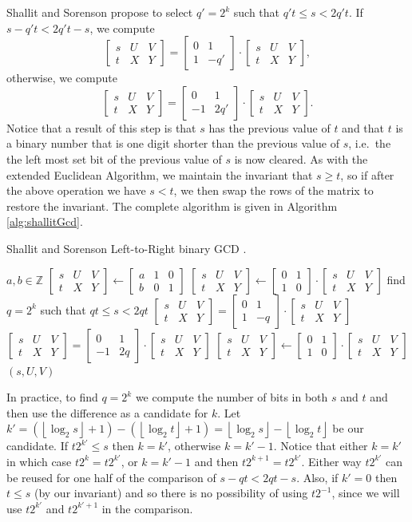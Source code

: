 \documentclass{ucalgthes1}
\theoremstyle{definition}
\newcommand{\ZZ}{\mathbb{Z}}
\newcommand{\matrixtt}[4]{\left[ \begin{array}{rr} #1 & #2 \\ #3 & #4 \end{array} \right]}
\newcommand{\matrixThreeTwo}[6]{\left[ \begin{array}{rrr} #1 & #2 & #3 \\ #4 & #5 & #6 \end{array} \right]}
\newcommand{\floor}[1]{\left\lfloor #1 \right\rfloor}
\begin{document}
Shallit and Sorenson \cite{Shallit1994} propose to select $q'=2^k$ such that $q't \le s < 2q't$.  If $s - q't < 2q't - s$, we compute
\[
	\matrixThreeTwo{s}{U}{V}{t}{X}{Y} =
		\matrixtt{0}{1}{1}{-q'} \cdot \matrixThreeTwo{s}{U}{V}{t}{X}{Y},
\]
otherwise, we compute
\[
	\matrixThreeTwo{s}{U}{V}{t}{X}{Y} =
		\matrixtt{0}{1}{-1}{2q'} \cdot \matrixThreeTwo{s}{U}{V}{t}{X}{Y}.
\]
Notice that a result of this step is that $s$ has the previous value of $t$ and that $t$ is a binary number that is one digit shorter than the previous value of $s$, i.e.\ the the left most set bit of the previous value of $s$ is now cleared.  As with the extended Euclidean Algorithm, we maintain the invariant that $s \ge t$, so if after the above operation we have $s < t$, we then swap the rows of the matrix to restore the invariant. The complete algorithm is given in Algorithm \ref{alg:shallitGcd}.

\begin{algorithm}[h]
\caption{Shallit and Sorenson Left-to-Right binary GCD \cite{Shallit1994}.}
\label{alg:shallitGcd}
\begin{algorithmic}[1]
\REQUIRE $a,b \in \ZZ$
\STATE $\matrixThreeTwo{s}{U}{V}{t}{X}{Y} \gets 
        \matrixThreeTwo{a}{1}{0}{b}{0}{1}$
	\STATE $\matrixThreeTwo{s}{U}{V}{t}{X}{Y} \gets
	        \matrixtt{0}{1}{1}{0} \cdot \matrixThreeTwo{s}{U}{V}{t}{X}{Y}$
\ENDIF
{}
	\STATE find $q=2^k$ such that $qt \le s < 2qt$
		\STATE $\matrixThreeTwo{s}{U}{V}{t}{X}{Y} =
		\matrixtt{0}{1}{1}{-q} \cdot \matrixThreeTwo{s}{U}{V}{t}{X}{Y}$
	\ELSE
		\STATE $\matrixThreeTwo{s}{U}{V}{t}{X}{Y} =
		\matrixtt{0}{1}{-1}{2q} \cdot \matrixThreeTwo{s}{U}{V}{t}{X}{Y}$
	\ENDIF
		\STATE $\matrixThreeTwo{s}{U}{V}{t}{X}{Y} \gets
	    	    \matrixtt{0}{1}{1}{0} \cdot \matrixThreeTwo{s}{U}{V}{t}{X}{Y}$
	\ENDIF
\ENDWHILE
\RETURN $(s, U, V)$
\end{algorithmic}
\end{algorithm}
In practice, to find $q=2^k$ we compute the number of bits in both $s$ and $t$ and then use the difference as a candidate for $k$.  Let $k' = (\floor{\log_2s} + 1) - (\floor{\log_2t}+1) = \floor{\log_2s} - \floor{\log_2t}$ be our candidate.  If $t2^{k'} \le s$ then $k = k'$, otherwise $k = k'-1$.  Notice that either $k=k'$ in which case $t2^k=t2^{k'}$, or $k=k'-1$ and then $t2^{k+1} = t2^{k'}$.  Either way $t2^{k'}$ can be reused for one half of the comparison of $s-qt < 2qt - s$.  Also, if $k' = 0$ then $t \le s$ (by our invariant) and so there is no possibility of using $t2^{-1}$, since we will use $t2^{k'}$ and $t2^{k'+1}$ in the comparison.
\end{document}
